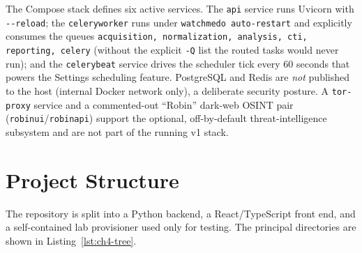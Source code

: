 \documentclass[12pt,a4paper]{report}
\renewcommand{\_}{\textunderscore\allowbreak}
\begin{document}
The Compose stack defines six active services. The \texttt{api} service runs Uvicorn with \texttt{-{}-reload}; the \texttt{celery\_worker} runs under \texttt{watchmedo auto-restart} and explicitly consumes the queues \texttt{acquisition,\,normalization,\,analysis,\,cti,\,reporting,\,celery} (without the explicit \texttt{-Q} list the routed tasks would never run); and the \texttt{celery\_beat} service drives the scheduler tick every 60 seconds that powers the Settings scheduling feature. PostgreSQL and Redis are \emph{not} published to the host (internal Docker network only), a deliberate security posture. A \texttt{tor-proxy} service and a commented-out ``Robin'' dark-web OSINT pair (\texttt{robin\_ui}/\texttt{robin\_api}) support the optional, off-by-default threat-intelligence subsystem and are not part of the running v1 stack.

\section{Project Structure}
\label{sec:ch4-structure}

The repository is split into a Python backend, a React/TypeScript front end, and a self-contained lab provisioner used only for testing. The principal directories are shown in Listing~\ref{lst:ch4-tree}.
\end{document}
